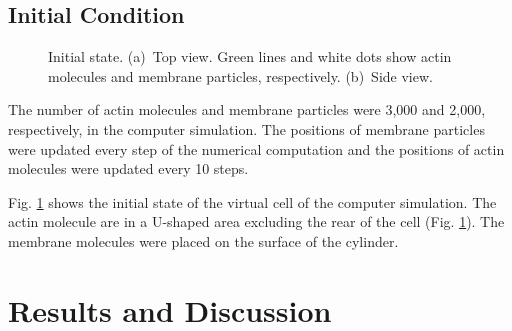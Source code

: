 \documentclass[a4paper,12pt, oneside]{book}
\begin{document}
\section{Initial Condition}
\begin{figure}[tbp]
\centering
  \caption{Initial state. (a)~Top view. Green lines and white dots show actin molecules and membrane particles, respectively. (b)~Side view.}
 \label{fig:ini}
\end{figure}
The number of actin molecules and membrane particles were 3,000 and 2,000, respectively, in the computer simulation.
The positions of membrane particles were updated every step of the numerical computation and the positions of actin molecules were updated every 10 steps.

Fig. \ref{fig:ini} shows the initial state of the virtual cell of  the computer simulation.
The actin molecule are in a U-shaped area excluding the rear of the cell (Fig. \ref{fig:ini}).
The membrane molecules were placed on the surface of the cylinder.

\chapter{Results and Discussion}
\end{document}
